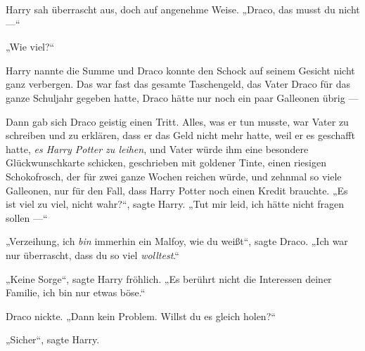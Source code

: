 Harry sah überrascht aus, doch auf angenehme Weise.
„Draco, das musst du nicht —“

„Wie viel?“

Harry nannte die Summe und Draco konnte den Schock auf seinem Gesicht nicht ganz verbergen. Das war fast das gesamte Taschengeld, das Vater Draco für das ganze Schuljahr gegeben hatte, Draco hätte nur noch ein paar Galleonen übrig —

Dann gab sich Draco geistig einen Tritt. Alles, was er tun musste, war Vater zu schreiben und zu erklären, dass er das Geld nicht mehr hatte, weil er es geschafft hatte, \emph{es Harry Potter zu leihen}, und Vater würde ihm eine besondere Glückwunschkarte schicken, geschrieben mit goldener Tinte, einen riesigen Schokofrosch, der für zwei ganze Wochen reichen würde, und zehnmal so viele Galleonen, nur für den Fall, dass Harry Potter noch einen Kredit brauchte.
„Es ist viel zu viel, nicht wahr?“, sagte Harry.
„Tut mir leid, ich hätte nicht fragen sollen —“

„Verzeihung, ich \emph{bin} immerhin ein Malfoy, wie du weißt“, sagte Draco.
„Ich war nur überrascht, dass du so viel \emph{wolltest}.“

„Keine Sorge“, sagte Harry fröhlich.
„Es berührt nicht die Interessen deiner Familie, ich bin nur etwas böse.“

Draco nickte.
„Dann kein Problem. Willst du es gleich holen?“

„Sicher“, sagte Harry.

